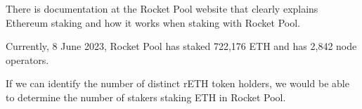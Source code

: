 \documentclass{article}
\begin{document}
There is documentation at the Rocket Pool website that clearly explains
Ethereum staking and how it works when staking with Rocket Pool.

Currently, 8 June 2023, Rocket Pool has staked 722,176 ETH and has 2,842 node
operators.

If we can identify the number of distinct rETH token holders, we would be able
to determine the number of stakers staking ETH in Rocket Pool. 

%
%
%
%
%
%
\end{document}
